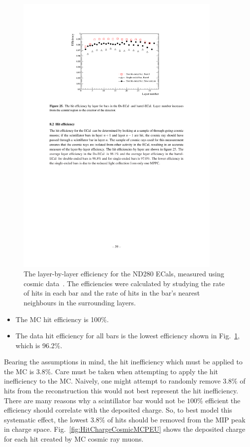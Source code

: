 \begin{figure}[t!]
  \centering
  \includegraphics[width=10cm]{images/measurement/systematics/detector/threshold/layer_efficiency_cosmics_data.pdf}
  \caption{The layer-by-layer efficiency for the ND280 ECals, measured using cosmic data~\cite{1748-0221-8-10-P10019}.  The efficiencies were calculated by studying the rate of hits in each bar and the rate of hits in the bar's nearest neighbours in the surrounding layers.}
  \label{fig:LayerEfficiencyCosmicData}
\end{figure}
\begin{itemize}
\item The MC hit efficiency is 100$\%$.
\item The data hit efficiency for all bars is the lowest efficiency shown in Fig.~\ref{fig:LayerEfficiencyCosmicData}, which is 96.2$\%$.
\end{itemize}
Bearing the assumptions in mind, the hit inefficiency which must be applied to the MC is 3.8$\%$.  Care must be taken when attempting to apply the hit inefficiency to the MC.  Naively, one might attempt to randomly remove 3.8$\%$ of hits from the reconstruction this would not best represent the hit inefficiency.  There are many reasons why a scintillator bar would not be $100\%$ efficient the efficiency should correlate with the deposited charge.  So, to best model this systematic effect, the lowest 3.8$\%$ of hits should be removed from the MIP peak in charge space.  Fig.~\ref{fig:HitChargeCosmicMCPEU} shows the deposited charge for each hit created by MC cosmic ray muons.
